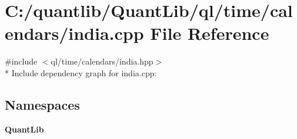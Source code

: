 \section{C\+:/quantlib/\+Quant\+Lib/ql/time/calendars/india.cpp File Reference}
\label{india_8cpp}
{\ttfamily \#include $<$ql/time/calendars/india.\+hpp$>$}\\*
Include dependency graph for india.\+cpp\+:
\subsection*{Namespaces}
\begin{DoxyCompactItemize}
\item 
 {\bf Quant\+Lib}
\end{DoxyCompactItemize}
